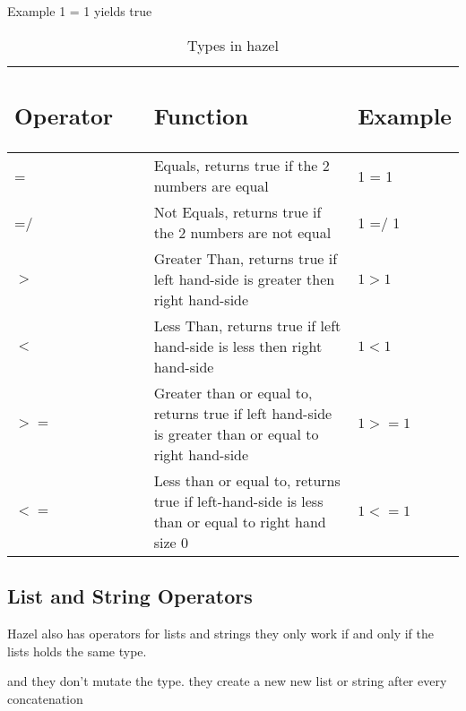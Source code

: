 \documentclass{article}
\begin{document}
Example  1 = 1 yields true 

\begin{table}[H]
    \centering
    \begin{tabular}{p{0.35\linewidth} | p{0.6\linewidth}| p{0.6\linewidth} }
      
\subsection*{Operator} & \subsection*{Function} & \subsection*{Example}
 \\ \hline
      = & Equals, returns true if the 2 numbers are equal & 1 = 1 \\ \hline
      =/ & Not Equals, returns true if the 2 numbers are not equal & 1 =/ 1 \\ \hline
      $>$ & Greater Than, returns true if left hand-side is greater then right hand-side & $1 > 1$ \\ \hline
      $<$ & Less Than, returns true if left hand-side is less then right hand-side  & $1 < 1$ \\ \hline
      $>=$ & Greater than or equal to, returns true if left hand-side is greater than or equal to right hand-side  & $1 >= 1$\\ \hline
      $<=$ & Less than or equal to, returns true if left-hand-side is less than or equal to right hand size 0 & $1 <= 1$ \\ \hline
      
    \end{tabular}
        \caption{Types in hazel}
\end{table}


\subsection{List and String Operators}

Hazel also has operators for lists and strings 
they only work if and only if the lists holds the same type. 

and they don't mutate the type. they create a new new list or string after every concatenation
\end{document}
